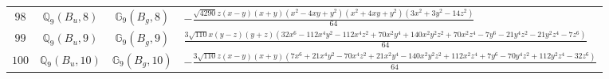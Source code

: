 \documentclass[fleqn,8pt,landscape]{jsarticle}
\begin{document}
\begin{table}[ht!]
\begin{center}
\begin{tabular}{cccl}
$ 98 $ & $ \mathbb{Q}_{9}(B_{u},8) $ & $ \mathbb{G}_{9}(B_{g},8) $ & $ - \frac{\sqrt{4290} z \left(x - y\right) \left(x + y\right) \left(x^{2} - 4 x y + y^{2}\right) \left(x^{2} + 4 x y + y^{2}\right) \left(3 x^{2} + 3 y^{2} - 14 z^{2}\right)}{64} $ \\
$ 99 $ & $ \mathbb{Q}_{9}(B_{u},9) $ & $ \mathbb{G}_{9}(B_{g},9) $ & $ \frac{3 \sqrt{110} x \left(y - z\right) \left(y + z\right) \left(32 x^{6} - 112 x^{4} y^{2} - 112 x^{4} z^{2} + 70 x^{2} y^{4} + 140 x^{2} y^{2} z^{2} + 70 x^{2} z^{4} - 7 y^{6} - 21 y^{4} z^{2} - 21 y^{2} z^{4} - 7 z^{6}\right)}{64} $ \\
$ 100 $ & $ \mathbb{Q}_{9}(B_{u},10) $ & $ \mathbb{G}_{9}(B_{g},10) $ & $ - \frac{3 \sqrt{110} z \left(x - y\right) \left(x + y\right) \left(7 x^{6} + 21 x^{4} y^{2} - 70 x^{4} z^{2} + 21 x^{2} y^{4} - 140 x^{2} y^{2} z^{2} + 112 x^{2} z^{4} + 7 y^{6} - 70 y^{4} z^{2} + 112 y^{2} z^{4} - 32 z^{6}\right)}{64} $ \\
 \hline \hline
\end{tabular}
\end{center}
\end{table}
\end{document}
